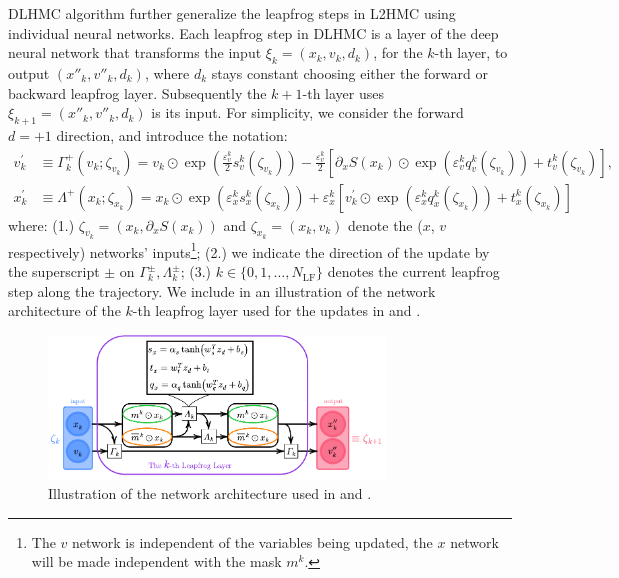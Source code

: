\documentclass{article} %
\begin{document}
DLHMC algorithm further generalize the leapfrog steps in L2HMC using individual neural networks.
Each leapfrog step in DLHMC is a layer of the deep neural network that transforms the input $\xi_k=(x_k,v_k,d_k)$, for the $k$-th layer,
to output $(x''_k,v''_k,d_k)$, where $d_k$ stays constant choosing either the forward or backward leapfrog layer.
Subsequently the $k+1$-th layer uses $\xi_{k+1}=(x''_k,v''_k,d_k)$ is its input.
For simplicity, we consider the forward \(d=+1\) direction, and introduce the notation:
%
\begin{align}
   v^{\prime}_{k} &\equiv \Gamma^{+}_{k}(v_{k};\zeta_{v_{k}})
   = v_{k}\odot \exp{\left(\tfrac{\varepsilon^{k}_{v}}{2}s_{v}^{k}(\zeta_{v_{k}})\right)} -
   \tfrac{\varepsilon^{k}_{v}}{2}{\left[\partial_{x}S(x_{k})\odot\exp{\left(\varepsilon^{k}_{v} q_{v}^{k}(\zeta_{v_{k}})\right)}
      +t_{v}^{k}(\zeta_{v_{k}})\right]},\label{eq:new_momentum_update}\\
   x^{\prime}_{k} &\equiv \Lambda^{+}(x_{k};\zeta_{x_{k}})
   = x_{k}\odot\exp(\varepsilon^{k}_{x} s^{k}_{x}(\zeta_{x_{k}}))
   + \varepsilon^{k}_{x}\left[v^{\prime}_{k}\odot\exp(\varepsilon^{k}_{x} q^{k}_{x}(\zeta_{x_{k}}))
         + t^{k}_{x}(\zeta_{x_{k}})\right]\label{eq:new_position_update}
\end{align}
%
where: (1.) \(\zeta_{v_{k}} = (x_{k}, \partial_{x}S(x_{k}))\) and \(\zeta_{x_{k}} = (x_{k}, v_{k})\) denote the (\(x\),
\(v\) respectively) networks' inputs\footnote{%
 The $v$ network is independent of the variables being updated,
 the $x$ network will be made independent with the mask $m^k$.};
  (2.) we indicate the direction of the update by the superscript \(\pm\) on \(\Gamma^{\pm}_{k},
\Lambda^{\pm}_{k}\); (3.) \(k\in\{0,1,\ldots,N_{\mathrm{LF}}\}\) denotes the current leapfrog step along the trajectory.
%
We include in  an illustration of the network architecture of the $k$-th leapfrog layer
used for the updates in  and .
%
\begin{figure}[htpb]
   \centering
   \includegraphics[width=0.8\textwidth]{figures/network11.pdf}
   \caption{\label{fig:network}Illustration of the network architecture used in  and .}
\end{figure}
\end{document}
